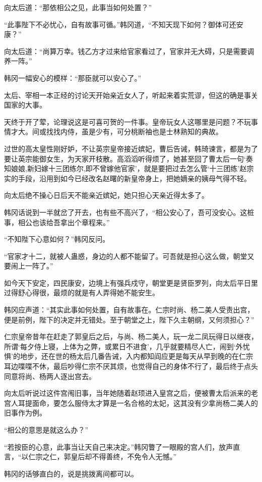 向太后道：“那依相公之见，此事当如何处置？”

“此事陛下不必忧心，自有故事可循。”韩冈道，“不知天现下如何？御体可还安康？”

向太后道：“尚算万幸。钱乙方才过来给官家看过了，官家并无大碍，只是需要调养一阵。”

韩冈一幅安心的模样：“那臣就可以安心了。”

太后、宰相一本正经的讨论天开始亲近女人了，听起来着实荒谬，但这的确是事关国家的大事。

天终于开了荤，论理说这是可喜可贺的一件事。皇帝玩女人这哪里是问题？不玩事情才大。间或找找内侍，虽是少有，可分桃断袖也是士林熟知的典故。

过世的高太皇性刚好妒，不让英宗皇帝接近嫔妃，曹后告诫，韩琦谏言，都是为了要让英宗能御女生，为天家开枝散。高滔滔听得烦了，她甚至回了曹太后一句‘奏知娘娘,新妇嫁十三团练尔,即不曾嫁他官家’，就是要把过去怎么管‘十三团练’赵宗实的手段，沿用到如今已经改名赵曙的新皇帝身上，把她嫡亲的姨母气得不轻。

向太后绝不操心日后天不能亲近嫔妃，她只担心天亲近得太多了。

韩冈话说到一半就岔了开去，也有些不高兴了，“相公安心了，吾可没安心。这桩事，相公也该给吾拿出个章程来。”

“不知陛下心意如何？”韩冈反问。

“官家才十二，就被人蛊惑，身边的人都不能留了。可吾就是担心这么做，朝堂又要闹上一阵了。”

如今天下安定，四民康安，边境上有强兵戍守，朝堂更是贤臣罗列，向太后平日里过得舒心得很，最烦的就是有人弄得她不能安生。

韩冈应声道：“其实此事如何处置，自有故事在。仁宗时尚、杨二美人受责出宫，便是前例，陛下的决定并无错处。至于朝堂之上，陛下久主朝纲，又何须担心？”

仁宗皇帝昔年在赶走了郭皇后之后，与尚、杨二美人，玩一龙二凤玩得日以继夜，所谓‘每夕侍上寝，上体为之弊，或累日不进食’，几乎就要精尽人亡，闹到‘外忧惧’的地步，还在世的杨太后几番告诫，入内都知阎应更是每天从早到晚的在仁宗耳边喋喋不休，最后吵得仁宗不厌其烦，也觉得自己的身体不行了，最后终于点头同意将尚、杨两人逐出宫去。

向太后听说过这件宫闱旧事，当年她随着赵顼进入皇宫之后，便被曹太后派来的老宫人耳提面命，要怎么服侍太才算是一名合格的太妃，这其没有少拿尚杨二美人的旧事作为例。

“相公的意思是就这么办？”

“若按臣的心意，此事当让天自己来决定。”韩冈瞥了一眼殿的宫人们，放声直言，“以仁宗之仁，郭皇后却不得善终，不免令人无憾。”

韩冈的话够直白的，说是挑拨离间都可以。

